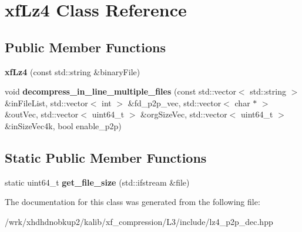 \hypertarget{classxfLz4}{\section{xf\-Lz4 Class Reference}
\label{classxfLz4}
}
\subsection*{Public Member Functions}
\begin{DoxyCompactItemize}
\item 
\hypertarget{classxfLz4_aa8ba8ffba63ceb3d39a1600ccc36b227}{{\bfseries xf\-Lz4} (const std\-::string \&binary\-File)}\label{classxfLz4_aa8ba8ffba63ceb3d39a1600ccc36b227}

\item 
\hypertarget{classxfLz4_a528f929539a52ae3693c8427da480ba6}{void {\bfseries decompress\-\_\-in\-\_\-line\-\_\-multiple\-\_\-files} (const std\-::vector$<$ std\-::string $>$ \&in\-File\-List, std\-::vector$<$ int $>$ \&fd\-\_\-p2p\-\_\-vec, std\-::vector$<$ char $\ast$ $>$ \&out\-Vec, std\-::vector$<$ uint64\-\_\-t $>$ \&org\-Size\-Vec, std\-::vector$<$ uint64\-\_\-t $>$ \&in\-Size\-Vec4k, bool enable\-\_\-p2p)}\label{classxfLz4_a528f929539a52ae3693c8427da480ba6}

\end{DoxyCompactItemize}
\subsection*{Static Public Member Functions}
\begin{DoxyCompactItemize}
\item 
\hypertarget{classxfLz4_ae646fa73ab42f5b86172d5bedb18f8bd}{static uint64\-\_\-t {\bfseries get\-\_\-file\-\_\-size} (std\-::ifstream \&file)}\label{classxfLz4_ae646fa73ab42f5b86172d5bedb18f8bd}

\end{DoxyCompactItemize}


The documentation for this class was generated from the following file\-:\begin{DoxyCompactItemize}
\item 
/wrk/xhdhdnobkup2/kalib/xf\-\_\-compression/\-L3/include/lz4\-\_\-p2p\-\_\-dec.\-hpp\end{DoxyCompactItemize}

